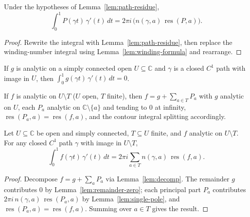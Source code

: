 \begin{lemma}
  \label{lem:single-pole}
  \leanok
  Under the hypotheses of Lemma~\ref{lem:path-residue},
  \[ \int_0^1 P(\gamma t)\,\gamma'(t)\, dt = 2\pi i\, \big(n(\gamma, a)\, \operatorname{res}(P, a)\big). \]
\end{lemma}
\begin{proof}
  \leanok
  Rewrite the integral with Lemma~\ref{lem:path-residue}, then replace the winding-number
  integral using Lemma~\ref{lem:winding-formula} and rearrange.
\end{proof}

\begin{lemma}
  \label{lem:remainder-zero}
  \leanok
  If $g$ is analytic on a simply connected open $U \subseteq \mathbb{C}$ and $\gamma$ is a
  closed $C^1$ path with image in $U$, then $\int_0^1 g(\gamma t)\,\gamma'(t)\,dt = 0$.
\end{lemma}

\begin{lemma}
  \label{lem:decomp}
  \leanok
  If $f$ is analytic on $U \setminus T$ ($U$ open, $T$ finite), then $f = g + \sum_{a \in T} P_a$
  with $g$ analytic on $U$, each $P_a$ analytic on $\mathbb{C} \setminus \{a\}$ and tending to
  $0$ at infinity, $\operatorname{res}(P_a, a) = \operatorname{res}(f, a)$, and the contour
  integral splitting accordingly.
\end{lemma}

\begin{theorem}
  \label{thm:residue}
  \leanok
  Let $U \subseteq \mathbb{C}$ be open and simply connected, $T \subseteq U$ finite, and $f$
  analytic on $U \setminus T$. For any closed $C^1$ path $\gamma$ with image in $U \setminus T$,
  \[ \int_0^1 f(\gamma t)\,\gamma'(t)\, dt = 2\pi i \sum_{a \in T} n(\gamma, a)\, \operatorname{res}(f, a). \]
\end{theorem}
\begin{proof}
  \leanok
  Decompose $f = g + \sum_a P_a$ via Lemma~\ref{lem:decomp}. The remainder $g$ contributes $0$
  by Lemma~\ref{lem:remainder-zero}; each principal part $P_a$ contributes
  $2\pi i\, n(\gamma, a)\, \operatorname{res}(P_a, a)$ by Lemma~\ref{lem:single-pole}, and
  $\operatorname{res}(P_a, a) = \operatorname{res}(f, a)$. Summing over $a \in T$ gives the result.
\end{proof}
